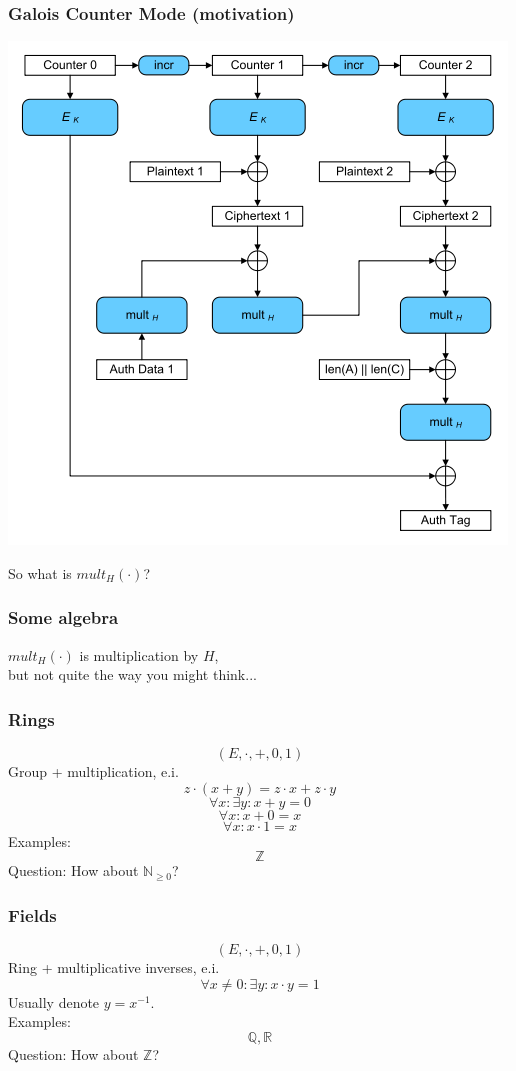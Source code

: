 \documentclass{beamer}
\begin{document}
\begin{frame}
\frametitle{Galois Counter Mode (motivation)}
\begin{center}
\includegraphics[height=0.8\textheight]{mode-gcm.png}
\end{center}
So what is $mult_{H}(\cdot)$?
\end{frame}

\begin{frame}
\frametitle{Some algebra}
\begin{center}
$mult_{H}(\cdot)$ is multiplication by $H$, \\
but not quite the way you might think...
\end{center}
\end{frame}

\begin{frame}
\frametitle{Rings}
\[
    (E, \cdot, +, 0, 1)
\]
Group + multiplication, e.i.
\[
    z \cdot (x + y)
    =
    z \cdot x
    +
    z \cdot y
\]
\[
    \forall x :
    \exists y :
    x + y = 0
\]
\[
    \forall x :
    x + 0 = x
\]
\[
    \forall x :
    x \cdot 1 = x
\]
Examples:
\[
    \mathbb{Z}
\]
Question: How about $\mathbb{N}_{\geq 0}$?
\end{frame}

\begin{frame}
\frametitle{Fields}
\[
    (E, \cdot, +, 0, 1)
\]
Ring + multiplicative inverses, e.i.
\[
    \forall x \neq 0 : \exists y : x \cdot y = 1
\]
Usually denote $y = x^{-1}$. \\
Examples:
\[
    \mathbb{Q}, \mathbb{R}
\]
Question: How about $\mathbb{Z}$?
\end{frame}
\end{document}
